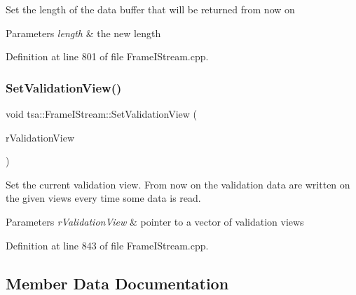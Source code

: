 Set the length of the data buffer that will be returned from now on 
\begin{DoxyParams}{Parameters}
{\em length} & the new length \\
\hline
\end{DoxyParams}


Definition at line 801 of file Frame\+I\+Stream.\+cpp.

\mbox{\label{classtsa_1_1_frame_i_stream_a89e7cd73df5fb44c8235166d8b9ccd12}} 
\subsubsection{\texorpdfstring{Set\+Validation\+View()}{SetValidationView()}}
{\footnotesize\ttfamily void tsa\+::\+Frame\+I\+Stream\+::\+Set\+Validation\+View (\begin{DoxyParamCaption}\item[{std\+::vector$<$ \hyperlink{namespacetsa_ac599574bcc094eda25613724b8f3ca9e}{Seq\+View\+Double} $>$ $\ast$}]{r\+Validation\+View }\end{DoxyParamCaption})}

Set the current validation view. From now on the validation data are written on the given views every time some data is read.


\begin{DoxyParams}{Parameters}
{\em r\+Validation\+View} & pointer to a vector of validation views \\
\hline
\end{DoxyParams}


Definition at line 843 of file Frame\+I\+Stream.\+cpp.



\subsection{Member Data Documentation}
\mbox{\label{classtsa_1_1_frame_i_stream_aef647c717912f7f4522d98fa967de2a0}} 
